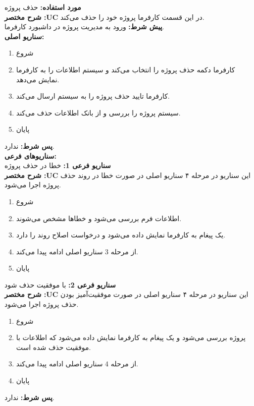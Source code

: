 \textbf{مورد استفاده:}
حذف پروژه
\\
\textbf{شرح مختصر :UC}
در این قسمت کارفرما پروژه خود را حذف می‌کند.
\\
\textbf{پيش شرط:}
ورود به مدیریت پروژه در داشبورد کارفرما.
\\
\textbf{سناريو اصلی:}
\begin{enumerate}
	\item
	شروع
	\item
	کارفرما دکمه حذف پروژه را انتخاب می‌کند و سیستم اطلاعات را به کارفرما نمایش می‌دهد.
	\item
	کارفرما تایید حذف پروژه را به سیستم ارسال می‌کند.
	\item
	سیستم پروژه را بررسی و از بانک اطلاعات حذف می‌کند.
	\item
	پایان
\end{enumerate}

\noindent
\textbf{پس شرط:}
ندارد.
\\
\textbf{سناريوهای فرعی:}
\\
\textbf{سناريو فرعی 1:}
خطا در حذف پروژه
\\
\textbf{شرح مختصر :UC}
این سناریو در مرحله ۴ سناریو اصلی در صورت خطا در روند حذف پروژه اجرا می‌شود.
\begin{enumerate}
	\item
	شروع
	\item
	اطلاعات فرم بررسی می‌شود و خطاها مشخص می‌شوند.
	\item
	یک پیغام به کارفرما نمایش داده می‌شود و درخواست اصلاح روند را دارد.
	\item
	از مرحله 3 سناریو اصلی ادامه پیدا می‌کند.
	\item
	پایان
\end{enumerate}

\noindent
\textbf{سناريو فرعی 2:}
با موفقیت حذف شود
\\
\textbf{شرح مختصر :UC}
این سناریو در مرحله ۴ سناریو اصلی در صورت موفقیت‌آمیز بودن حذف پروژه اجرا می‌شود.
\begin{enumerate}
	\item
	شروع
	\item
	پروژه بررسی می‌شود و یک پیغام به کارفرما نمایش داده می‌شود که اطلاعات با موفقیت حذف شده است.
	\item
	از مرحله 4 سناریو اصلی ادامه پیدا می‌کند.
	\item
	پایان
\end{enumerate}

\noindent
\textbf{پس شرط:}
ندارد.


